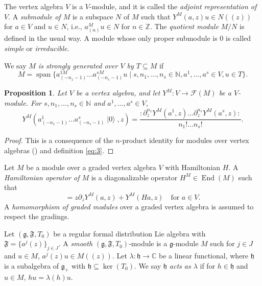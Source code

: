 \documentclass[a4paper, 12pt, reqno]{amsart}
\newtheorem{proposition}[theorem]{Proposition}
\theoremstyle{remark}
\DeclareMathOperator{\vac}{|0\rangle}
\DeclareMathOperator{\vspan}{span}
\DeclareMathOperator{\End}{End}
\begin{document}
The vertex algebra $V$ is a $V$-module, and it is called the \emph{adjoint representation of $V$}.
A \emph{submodule of $M$} is a subspace $N$ of $M$ such that $Y^M(a, z)u \in N((z))$ for $a \in V$ and $u \in N$, i.e., $a^M_{(n)}u \in N$ for $n \in \mathbb{Z}$.
The \emph{quotient module} $M/N$ is defined in the usual way.
A module whose only proper submodule is $0$ is called \emph{simple} or \emph{irreducible}.

We say \emph{$M$ is strongly generated over $V$ by $T \subseteq M$} if
\begin{equation*}
  M = \vspan\{a^{1M}_{(-n_1 - 1)}\dots a^{sM}_{(-n_s - 1)}u \mid s, n_1, \dots, n_s \in \mathbb{N}, a^1, \dots, a^s \in V, u \in T\}.
\end{equation*}

\begin{proposition}
  \label{prp:3}
  Let $V$ be a vertex algebra, and let $Y^M: V \to \mathcal{F}(M)$ be a $V$-module.
  For $s, n_1, \dots, n_s \in \mathbb{N}$ and $a^1, \dots, a^s \in V$,
  \begin{equation*}
    Y^M(a^1_{(-n_1 - 1)}\dots a^s_{(-n_s - 1)}\vac, z) = \frac{:\partial^{n_1}_zY^M(a^1, z)\dots\partial^{n_s}_zY^M(a^s, z):}{n_1!\dots n_s!}.
  \end{equation*}
\end{proposition}

\begin{proof}
  This is a consequence of the $n$-product identity for modules over vertex algebras (\cite[(5.2.16)]{lepowsky_introduction_2004}) and definition \eqref{eq:3}.
\end{proof}

Let $M$ be a module over a graded vertex algebra $V$ with Hamiltonian $H$.
A \emph{Hamiltonian operator of $M$} is a diagonalizable operator $H^M \in \End(M)$ such that
\begin{equation*}
  [H^M, Y^M(a, z)] = z\partial_zY^M(a, z) + Y^M(Ha, z) \quad \text{for $a \in V$}.
\end{equation*}
A \emph{homomorphism of graded modules} over a graded vertex algebra is assumed to respect the gradings.

Let $(\mathfrak{g}, \mathfrak{F}, T_0)$ be a regular formal distribution Lie algebra with $\mathfrak{F} = \{a^j(z)\}_{j \in J}$.
A \emph{smooth} $(\mathfrak{g}, \mathfrak{F}, T_0)$-module is a $\mathfrak{g}$-module $M$ such for $j \in J$ and $u \in M$, $a^j(z)u \in M((z))$.
Let $\lambda: \mathfrak{h} \to \mathbb{C}$ be a linear functional, where $\mathfrak{h}$ is a subalgebra of $\mathfrak{g}_+$ with $\mathfrak{h} \subseteq \ker(T_0)$.
We say $\mathfrak{h}$ \emph{acts as $\lambda$} if for $h \in \mathfrak{h}$ and $u \in M$, $hu = \lambda(h)u$.
\end{document}
